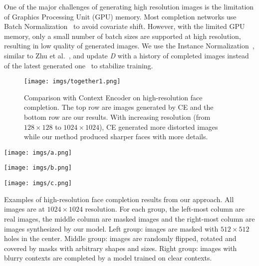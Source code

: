 \documentclass[acmtog,timestamp]{acmart}
\begin{document}
One of the major challenges of generating high resolution images is the limitation of Graphics Processing Unit (GPU) memory. Most completion networks use Batch Normalization~\cite{ioffe2015batch} to avoid covariate shift. However, with the limited GPU memory, only a small number of batch sizes are supported at high resolution, resulting in low quality of generated images. We use the Instance Normalization~\cite{ulyanov2016instance}, similar to Zhu et al.~\cite{zhu2017unpaired}, and update \textit{D} with a history of completed images instead of the latest generated one~\cite{shrivastava2016learning} to stabilize training.

\begin{figure*}
      \centering
      \begin{minipage}{1.0\textwidth}
          \centering
          \texttt{[image: imgs/together1.png]} %
      \end{minipage}\hfill
	  \caption{Comparison with Context Encoder on high-resolution face completion. The top row are images generated by CE and the bottom row are our results. With increasing resolution (from $128\times128$ to $1024\times1024$), CE generated more distorted images while our method produced sharper faces with more details.}
     \label{fig:grow}
\end{figure*}%
      \centering
      \begin{minipage}{0.33\textwidth}
          \centering
          \texttt{[image: imgs/a.png]} %
      \end{minipage}\hfill
      \begin{minipage}{0.33\textwidth}
          \centering
          \texttt{[image: imgs/b.png]} %
      \end{minipage}\hfill
      \begin{minipage}{0.33\textwidth}
          \centering
          \texttt{[image: imgs/c.png]} %
      \end{minipage}\hfill
	  \caption{Examples of high-resolution face completion results from our approach. All images are at $1024\times1024$ resolution. For each group, the left-most column are real images, the middle column are masked images and the right-most column are images synthesized by our model. Left group: images are masked with $512\times512$ holes in the center. Middle group: images are randomly flipped, rotated and covered by masks with arbitrary shapes and sizes. Right group: images with blurry contexts are completed by a model trained on clear contexts.}
\end{document}
